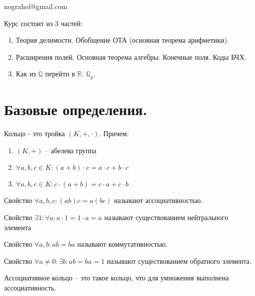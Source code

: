 \documentclass[document.tex]{subfiles}
\begin{document}
nograhol@gmail.com

Курс состоит из 3 частей:
\begin{enumerate}
\item Теория делимости. Обобщение ОТА (основная теорема арифметики).
\item Расширения полей. Основная теорема алгебры. Конечные поля. Коды БЧХ.
\item Как из $\mathbb{Q}$ перейти в $\mathbb{R}$. $\mathbb{Q}_p$.
\end{enumerate}

\section{Базовые определения.}

\begin{definition}
Кольцо - это тройка $(K, +, \cdot)$. Причем:
\begin{enumerate}
\item $(K, +)$ -- абелева группа
\item $\forall a, b, c \in K: (a + b) \cdot c = a \cdot c + b \cdot c$
\item $\forall a, b, c \in K: c \cdot (a + b) = c \cdot a + c \cdot b$
\end{enumerate}
\end{definition}

\begin{definition}
Свойство $\forall a, b, c: (ab)c = a(bc)$ называют ассоциативностью.
\end{definition}

\begin{definition}
Свойство $\exists 1 : \forall a : a \cdot 1 = 1 \cdot a = a$ называют существованием нейтрального элемента
\end{definition}

\begin{definition}
Свойство $\forall a, b: ab = ba$ называют коммутативностью.
\end{definition}

\begin{definition}
Свойство $\forall a \neq 0 : \exists b : ab = ba = 1$ называют существованием обратного элемента.
\end{definition}

\begin{definition}
Ассоциативное кольцо -- это такое кольцо, что для умножения выполнена ассоциативность.
\end{definition}
\end{document}
